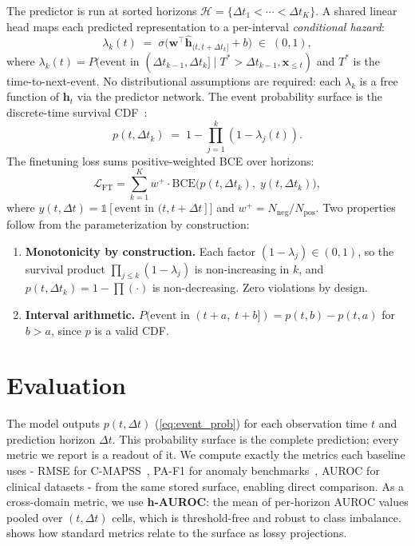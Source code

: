 \documentclass{article}
\newcommand{\h}{\mathbf{h}}
\newcommand{\loss}{\mathcal{L}}
\begin{document}
The predictor is run at sorted horizons $\mathcal{H} = \{{\Delta t}_1 < \cdots < {\Delta t}_K\}$. A shared linear head maps each predicted representation to a per-interval \emph{conditional hazard}:
\begin{equation}
  \lambda_k(t) \;=\; \sigma\!\bigl(\mathbf{w}^\top \hat{\h}_{(t, t+\Delta t_k]} + b\bigr) \;\in\; (0, 1),
  \label{eq:hazard}
\end{equation}
where $\lambda_k(t) = P(\text{event in } (\Delta t_{k-1}, \Delta t_k] \mid T^* > \Delta t_{k-1}, \mathbf{x}_{\leq t})$ and $T^*$ is the time-to-next-event. No distributional assumptions are required: each $\lambda_k$ is a free function of $\h_t$ via the predictor network. The event probability surface is the discrete-time survival CDF~\citep{lee2018deephit,ren2019drsa}:
\begin{equation}
  p(t, \Delta t_k) \;=\; 1 - \prod_{j=1}^{k} (1 - \lambda_j(t)).
  \label{eq:event_prob}
\end{equation}
The finetuning loss sums positive-weighted BCE over horizons:
\begin{equation}
  \loss_\text{FT} = \sum_{k=1}^{K} w^+ \cdot \text{BCE}\bigl(p(t, \Delta t_k),\; y(t, \Delta t_k)\bigr),
  \label{eq:ft_loss}
\end{equation}
where $y(t, \Delta t) = \mathbb{1}[\text{event in } (t, t{+}\Delta t]]$ and $w^+ = N_{\text{neg}} / N_{\text{pos}}$. Two properties follow from the parameterization by construction:
\begin{enumerate}[nosep,leftmargin=*]
  \item \textbf{Monotonicity by construction.} Each factor $(1 - \lambda_j) \in (0, 1)$, so the survival product $\prod_{j \leq k}(1 - \lambda_j)$ is non-increasing in $k$, and $p(t, \Delta t_k) = 1 - \prod(\cdot)$ is non-decreasing. Zero violations by design.
  \item \textbf{Interval arithmetic.} $P(\text{event in } (t{+}a,\; t{+}b]) = p(t, b) - p(t, a)$ for $b > a$, since $p$ is a valid CDF.
\end{enumerate}

\section{Evaluation}
\label{sec:metrics}

The model outputs $p(t, \Delta t)$ (\cref{eq:event_prob}) for each observation time $t$ and prediction horizon $\Delta t$. This probability surface is the complete prediction; every metric we report is a readout of it. We compute exactly the metrics each baseline uses - RMSE for C-MAPSS~\citep{fan2024star}, PA-F1 for anomaly benchmarks~\citep{xu2022anomalytransformer,mtsjepa2026}, AUROC for clinical datasets - from the same stored surface, enabling direct comparison. As a cross-domain metric, we use \textbf{h-AUROC}: the mean of per-horizon AUROC values pooled over $(t, \Delta t)$ cells, which is threshold-free and robust to class imbalance.  shows how standard metrics relate to the surface as lossy projections.
\end{document}
